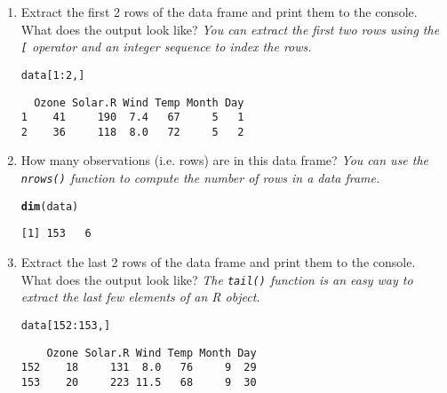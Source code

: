 \documentclass{article}\usepackage[]{graphicx}\usepackage[]{color}
\makeatletter
\newcommand{\hlnum}[1]{\textcolor[rgb]{0.686,0.059,0.569}{#1}}%
\newcommand{\hlopt}[1]{\textcolor[rgb]{0,0,0}{#1}}%
\newcommand{\hlstd}[1]{\textcolor[rgb]{0.345,0.345,0.345}{#1}}%
\newcommand{\hlkwd}[1]{\textcolor[rgb]{0.737,0.353,0.396}{\textbf{#1}}}%
\newenvironment{kframe}{%
 \def\at@end@of@kframe{}%
 \ifinner\ifhmode%
  \def\at@end@of@kframe{\end{minipage}}%
  \begin{minipage}{\columnwidth}%
 \fi\fi%
 \def\FrameCommand##1{\hskip\@totalleftmargin \hskip-\fboxsep
 \colorbox{shadecolor}{##1}\hskip-\fboxsep
     \hskip-\linewidth \hskip-\@totalleftmargin \hskip\columnwidth}%
 \MakeFramed {\advance\hsize-\width
   \@totalleftmargin\z@ \linewidth\hsize
   \@setminipage}}%
 {\par\unskip\endMakeFramed%
 \at@end@of@kframe}
\newenvironment{knitrout}{}{} %
\makeatother
\begin{document}
\begin{enumerate}
  \item Extract the first 2 rows of the data frame and print them to the console. What does the output look like?
  \emph{You can extract the first two rows using the \texttt{[} operator and an integer sequence to index the rows.}
\begin{knitrout}
\color{fgcolor}\begin{kframe}
\begin{alltt}
\hlstd{data[}\hlnum{1}\hlopt{:}\hlnum{2}\hlstd{, ]}
\end{alltt}
\begin{verbatim}
  Ozone Solar.R Wind Temp Month Day
1    41     190  7.4   67     5   1
2    36     118  8.0   72     5   2
\end{verbatim}
\end{kframe}
\end{knitrout}

  \item How many observations (i.e. rows) are in this data frame?
  \emph{You can use the \texttt{nrows()} function to compute the number of rows in a data frame.}
\begin{knitrout}
\color{fgcolor}\begin{kframe}
\begin{alltt}
\hlkwd{dim}\hlstd{(data)}
\end{alltt}
\begin{verbatim}
[1] 153   6
\end{verbatim}
\end{kframe}
\end{knitrout}

  \item Extract the last 2 rows of the data frame and print them to the console. What does the output look like?
  \emph{The \texttt{tail()} function is an easy way to extract the last few elements of an R object.}
\begin{knitrout}
\color{fgcolor}\begin{kframe}
\begin{alltt}
\hlstd{data[}\hlnum{152}\hlopt{:}\hlnum{153}\hlstd{,]}
\end{alltt}
\begin{verbatim}
    Ozone Solar.R Wind Temp Month Day
152    18     131  8.0   76     9  29
153    20     223 11.5   68     9  30
\end{verbatim}
\end{kframe}
\end{knitrout}
    

\end{enumerate}
\end{document}
